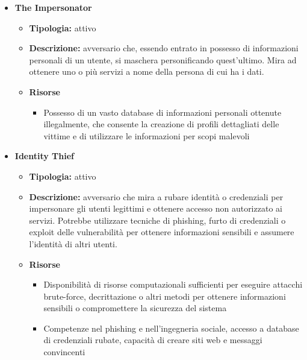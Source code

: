 \begin{itemize}
        \item \textbf{The Impersonator}
            \begin{itemize}
                \item \textbf{Tipologia:} attivo
                
                \item \textbf{Descrizione:} avversario che, essendo entrato in possesso di informazioni personali di un utente, si maschera personificando quest’ultimo.
                Mira ad ottenere uno o più servizi a nome della persona di cui ha i dati.
                
                \item \textbf{Risorse}
                    \begin{itemize}
                        \item Possesso di un vasto database di informazioni personali ottenute illegalmente, che consente la creazione di profili dettagliati delle vittime e di utilizzare le informazioni per scopi malevoli
                    \end{itemize}
            \end{itemize}


        \item \textbf{Identity Thief}
            \begin{itemize}
                \item \textbf{Tipologia:} attivo

                \item \textbf{Descrizione:} avversario che mira a rubare identità o credenziali per impersonare gli utenti legittimi e ottenere accesso non autorizzato ai servizi.
                Potrebbe utilizzare tecniche di phishing, furto di credenziali o exploit delle vulnerabilità per ottenere informazioni sensibili e assumere l'identità di altri utenti.

                \item \textbf{Risorse}
                    \begin{itemize}
                        \item Disponibilità di risorse computazionali sufficienti per eseguire attacchi brute-force, decrittazione o altri metodi per ottenere informazioni sensibili o compromettere la sicurezza del sistema

                        \vspace{3mm}

                        \item Competenze nel phishing e nell'ingegneria sociale, accesso a database di credenziali rubate, capacità di creare siti web e messaggi convincenti
                    \end{itemize}
            \end{itemize}



\end{itemize}
